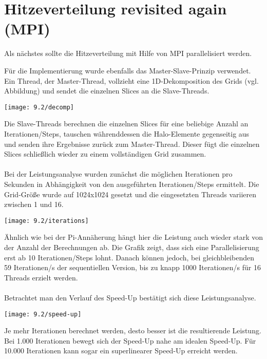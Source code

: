 \documentclass{article}
\newcommand{\enterProblemHeader}[1]{
}
\newcommand{\exitProblemHeader}[1]{
}
\newcounter{homeworkProblemCounter} %
\newcommand{\homeworkProblemName}{}
\newenvironment{homeworkProblem}[1][Problem \arabic{homeworkProblemCounter}]{ %
\stepcounter{homeworkProblemCounter} %
\renewcommand{\homeworkProblemName}{#1} %
\section{\homeworkProblemName} %
}{
}
\begin{document}
\begin{homeworkProblem}[Hitzeverteilung revisited again (MPI)]
Als nächstes sollte die Hitzeverteilung mit Hilfe von MPI parallelisiert werden. 

Für die Implementierung wurde ebenfalls das Master-Slave-Prinzip verwendet. Ein 
Thread, der Master-Thread, vollzieht eine 1D-Dekomposition des Grids (vgl. Abbildung)
und sendet die einzelnen Slices an die Slave-Threads.
\begin{center}
\texttt{[image: 9.2/decomp]}
\end{center}
Die Slave-Threads berechnen die einzelnen Slices für eine beliebige Anzahl an 
Iterationen/Steps, tauschen währenddessen die Halo-Elemente gegenseitig aus und 
senden ihre Ergebnisse zurück zum Master-Thread. Dieser fügt die einzelnen Slices
schließlich wieder zu einem vollständigen Grid zusammen.
\\\\
Bei der Leistungsanalyse wurden zunächst die möglichen Iterationen pro Sekunden in 
Abhängigkeit von den ausgeführten Iterationen/Steps ermittelt. Die Grid-Größe wurde
auf 1024x1024 gesetzt und die eingesetzten Threads variieren zwischen 1 und 16.
\begin{center}
\texttt{[image: 9.2/iterations]}
\end{center}
Ähnlich wie bei der Pi-Annäherung hängt hier die Leistung auch wieder stark von der
Anzahl der Berechnungen ab. Die Grafik zeigt, dass sich eine Parallelisierung erst 
ab 10 Iterationen/Steps lohnt. Danach können jedoch, bei gleichbleibenden 59
Iterationen/s der sequentiellen Version, bis zu knapp 1000 Iterationen/s für 16
Threads erzielt werden.
\\\\
Betrachtet man den Verlauf des Speed-Up bestätigt sich diese Leistungsanalyse. 
\begin{center}
\texttt{[image: 9.2/speed-up]}
\end{center}
Je mehr Iterationen berechnet werden, desto besser ist die resultierende Leistung.
Bei 1.000 Iterationen bewegt sich der Speed-Up nahe am idealen Speed-Up. Für 10.000
Iterationen kann sogar ein superlinearer Speed-Up erreicht werden.
\end{homeworkProblem}
\end{document}
